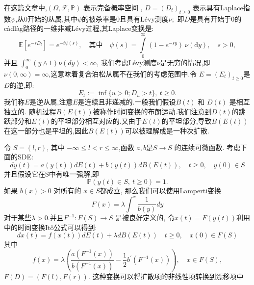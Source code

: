 \documentclass[12pt,final]{article}
\numberwithin{equation}{section}
\numberwithin{figure}{section}
\numberwithin{table}{section}
\theoremstyle{plain}
\theoremstyle{definition}
\theoremstyle{remark}
\begin{document}
	在这篇文章中,$(\Omega,\mathcal{F},\mathbb{P})$ 表示完备概率空间 , $D=(D_t)_{t\geq0}$ 表示具有Laplace指数$\psi$,从0开始的从属,其中$\psi$的被杀率是0且具有Lévy测度$\nu;$ 即$D$是具有开始于0的càdlàg路径的一维非减Lévy过程,其Laplace变换是:
	$$\mathbb{E}[e^{-sD_t}]=e^{-t\psi(s)},\quad\text{其中}\quad\psi(s)=\int\limits_0^\infty(1-e^{-sy})\:\nu(\text{d}y),\quad s>0,$$
	并且 $\int_0^\infty(y\wedge1)\nu(dy) < \infty$,
	我们考虑Lévy测度$\nu$是无穷的情况,即$\nu ( 0, \infty ) = \infty$,这意味着复合泊松从属不在我们的考虑范围中.令 $E=(E_t)_{t\geq0}$是$D$的逆,即:
	$$E_t:=\inf\{u>0;D_u>t\},\:t\geq0.$$
	我们称$E$是逆从属,注意$E$是连续且非递减的.一般我们假设$B(t)$ 和 $D(t)$ 是相互独立的. 随机过程$B(E(t))$被称作时间变换的布朗运动.我们注意到$D(t)$的跳跃部分和$E(t)$的平坦部分相互对应的.又由于$E(t)$的平坦部分,导致$B(E(t))$在这一部分也是平坦的,因此$B(E(t))$可以被理解成是一种次扩散.
	
	令 $S=(l,r)$, 其中 $-\infty\leq l<r\leq\infty$,函数 $a,b$是$S\to S$ 的连续可微函数. 考虑下面的SDE:
	$$dy(t)=a(y(t))dE(t)+b(y(t))dB(E(t)),\quad t\geq0,\quad y(0)\in S$$
	并且假设它在S中有唯一强解,即
	$$\mathbb{P}(y(t)\in S,\:t\geq0)=1.$$
	如果 $b(x)>0$ 对所有的 $x\in S$都成立, 那么我们可以使用Lamperti变换
	$$F(x)=\lambda\int^x\frac1{b(y)}dy$$
	对于某些$\lambda>0.$并且$F^{-1}:F(S)\to S$ 是被良好定义的, 令$x(t)=F(y(t))$利用\cite{umarov2018beyond}中的时间变换Itô公式可以得到:
	$$dx(t)=f(x(t))dE(t) + \lambda dB(E(t)) \quad t\geq0,\quad x(0)\in F(S)$$
	其中
	$$f(x)=\lambda\left(\frac{a(F^{-1}(x))}{b(F^{-1}(x))}-\frac12b^{\prime}(F^{-1}(x))\right),\quad x\in F(S),$$
	$F(D)=(F(l),F(r)).$ 这种变换可以将扩散项的非线性项转换到漂移项中
\end{document}

